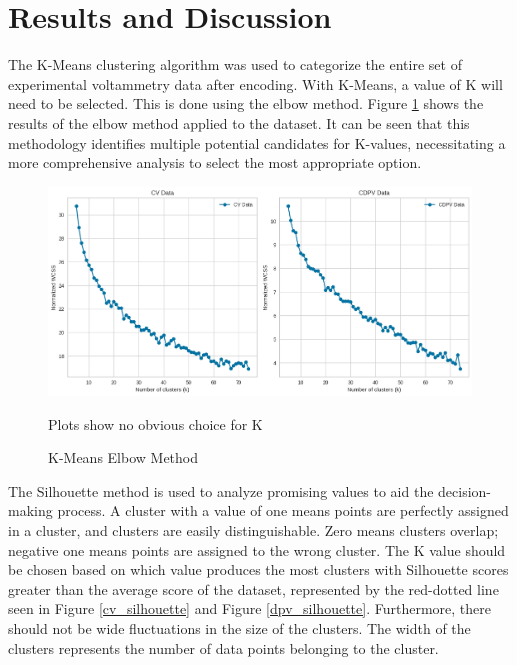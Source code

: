 \section{Results and Discussion}
The K-Means clustering algorithm was used to categorize the entire set of experimental voltammetry data after encoding. With K-Means, a value of K will need to be selected. This is done using the elbow method. Figure \ref{elbow} shows the results of the elbow method applied to the dataset. It can be seen that this methodology identifies multiple potential candidates for K-values, necessitating a more comprehensive analysis to select the most appropriate option. 
\begin{figure}[h!]
  \centering
    \includegraphics[width=1.0\textwidth]{figures/elbowmethod.png}
    \caption{K-Means Elbow Method}
    \label{elbow}
    Plots show no obvious choice for K
\end{figure}
The Silhouette method is used to analyze promising values to aid the decision-making process. A cluster with a value of one means points are perfectly assigned in a cluster, and clusters are easily distinguishable. Zero means clusters overlap; negative one means points are assigned to the wrong cluster. The K value should be chosen based on which value produces the most clusters with Silhouette scores greater than the average score of the dataset, represented by the red-dotted line seen in Figure \ref{cv_silhouette} and Figure \ref{dpv_silhouette}. Furthermore, there should not be wide fluctuations in the size of the clusters. The width of the clusters represents the number of data points belonging to the cluster. 
